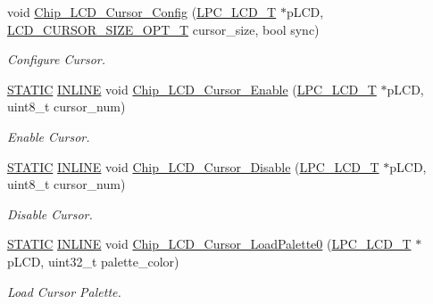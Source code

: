 \begin{DoxyCompactItemize}
void \hyperlink{group___l_c_d__18_x_x__43_x_x_ga160098404c8f66943767ee93e8fb575e}{Chip\+\_\+\+L\+C\+D\+\_\+\+Cursor\+\_\+\+Config} (\hyperlink{struct_l_p_c___l_c_d___t}{L\+P\+C\+\_\+\+L\+C\+D\+\_\+T} $\ast$p\+L\+CD, \hyperlink{group___l_c_d__18_x_x__43_x_x_gacd66e01df306369e87e482a36a2cc66b}{L\+C\+D\+\_\+\+C\+U\+R\+S\+O\+R\+\_\+\+S\+I\+Z\+E\+\_\+\+O\+P\+T\+\_\+T} cursor\+\_\+size, bool sync)
\begin{DoxyCompactList}\small\item\em Configure Cursor. \end{DoxyCompactList}\item 
\hyperlink{group___l_p_c___types___public___macros_ga10b2d890d871e1489bb02b7e70d9bdfb}{S\+T\+A\+T\+IC} \hyperlink{spifi__18xx__43xx_8h_a2eb6f9e0395b47b8d5e3eeae4fe0c116}{I\+N\+L\+I\+NE} void \hyperlink{group___l_c_d__18_x_x__43_x_x_ga70b227f6b0291dda72ec239ec34466a0}{Chip\+\_\+\+L\+C\+D\+\_\+\+Cursor\+\_\+\+Enable} (\hyperlink{struct_l_p_c___l_c_d___t}{L\+P\+C\+\_\+\+L\+C\+D\+\_\+T} $\ast$p\+L\+CD, uint8\+\_\+t cursor\+\_\+num)
\begin{DoxyCompactList}\small\item\em Enable Cursor. \end{DoxyCompactList}\item 
\hyperlink{group___l_p_c___types___public___macros_ga10b2d890d871e1489bb02b7e70d9bdfb}{S\+T\+A\+T\+IC} \hyperlink{spifi__18xx__43xx_8h_a2eb6f9e0395b47b8d5e3eeae4fe0c116}{I\+N\+L\+I\+NE} void \hyperlink{group___l_c_d__18_x_x__43_x_x_gac4c6ed11a22b83ceed1d2666f1e12b5a}{Chip\+\_\+\+L\+C\+D\+\_\+\+Cursor\+\_\+\+Disable} (\hyperlink{struct_l_p_c___l_c_d___t}{L\+P\+C\+\_\+\+L\+C\+D\+\_\+T} $\ast$p\+L\+CD, uint8\+\_\+t cursor\+\_\+num)
\begin{DoxyCompactList}\small\item\em Disable Cursor. \end{DoxyCompactList}\item 
\hyperlink{group___l_p_c___types___public___macros_ga10b2d890d871e1489bb02b7e70d9bdfb}{S\+T\+A\+T\+IC} \hyperlink{spifi__18xx__43xx_8h_a2eb6f9e0395b47b8d5e3eeae4fe0c116}{I\+N\+L\+I\+NE} void \hyperlink{group___l_c_d__18_x_x__43_x_x_ga164119b0cf9ee7d42cf1be435c60e4f5}{Chip\+\_\+\+L\+C\+D\+\_\+\+Cursor\+\_\+\+Load\+Palette0} (\hyperlink{struct_l_p_c___l_c_d___t}{L\+P\+C\+\_\+\+L\+C\+D\+\_\+T} $\ast$p\+L\+CD, uint32\+\_\+t palette\+\_\+color)
\begin{DoxyCompactList}\small\item\em Load Cursor Palette. \end{DoxyCompactList}\item 

\end{DoxyCompactItemize}
